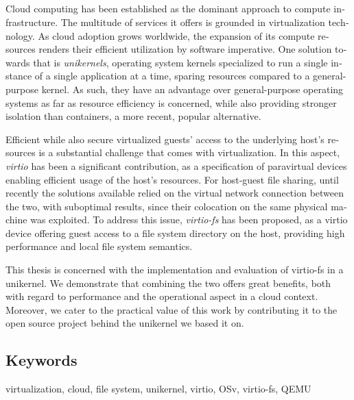 \begin{otherlanguage}{english}
	\chapter*{\abstractname}
	Cloud computing has been established as the dominant approach to compute
	infrastructure. The multitude of services it offers is grounded in
	virtualization technology. As cloud adoption grows worldwide, the expansion
	of its compute resources renders their efficient utilization by software
	imperative. One solution towards that is \emph{unikernels}, operating system
	kernels specialized to run a single instance of a single application at a
	time, sparing resources compared to a general-purpose kernel. As such,
	they have an advantage over general-purpose operating systems as far as
	resource efficiency is concerned, while also providing stronger isolation
	than containers, a more recent, popular alternative.

	Efficient while also secure virtualized guests' access to the underlying
	host's resources is a substantial challenge that comes with virtualization.
	In this aspect, \emph{virtio} has been a significant contribution, as a
	specification of paravirtual devices enabling efficient usage of the host's
	resources. For host-guest file sharing, until recently the solutions
	available relied on the virtual network connection between the two, with
	suboptimal results, since their colocation on the same physical machine was
	exploited. To address this issue, \emph{virtio-fs} has been proposed, as a
	virtio device offering guest access to a file system directory on the host,
	providing high performance and local file system semantics.

	This thesis is concerned with the implementation and evaluation of virtio-fs
	in a unikernel. We demonstrate that combining the two offers great benefits,
	both with regard to performance and the operational aspect in a cloud
	context. Moreover, we cater to the practical value of this work by
	contributing it to the open source project behind the unikernel we based it
	on.

	\section*{Keywords}
	\noindent
	virtualization, cloud, file system, unikernel, virtio, OSv, virtio-fs, QEMU
\end{otherlanguage}
